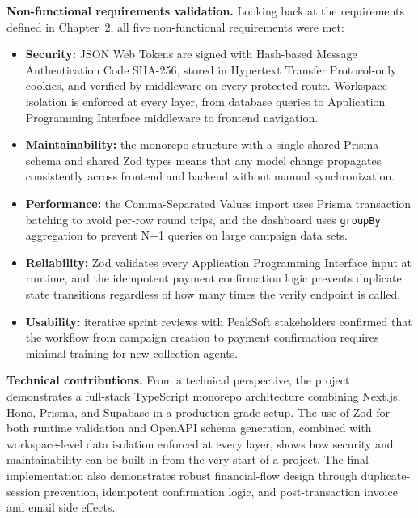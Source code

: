 \documentclass[12pt,a4paper]{report}
\begin{document}
\textbf{Non-functional requirements validation.}
Looking back at the requirements defined in Chapter~2, all five non-functional
requirements were met:
\begin{itemize}
  \item \textbf{Security:} JSON Web Tokens are signed with Hash-based Message Authentication Code SHA-256, stored in
        Hypertext Transfer Protocol-only cookies, and verified by middleware on every protected route.
        Workspace isolation is enforced at every layer, from database queries to
        Application Programming Interface middleware to frontend navigation.
  \item \textbf{Maintainability:} the monorepo structure with a single shared
        Prisma schema and shared Zod types means that any model change propagates
        consistently across frontend and backend without manual synchronization.
  \item \textbf{Performance:} the Comma-Separated Values import uses Prisma transaction batching to
        avoid per-row round trips, and the dashboard uses \texttt{groupBy}
        aggregation to prevent N+1 queries on large campaign data sets.
  \item \textbf{Reliability:} Zod validates every Application Programming Interface input at runtime, and the
        idempotent payment confirmation logic prevents duplicate state transitions
        regardless of how many times the verify endpoint is called.
  \item \textbf{Usability:} iterative sprint reviews with PeakSoft stakeholders
        confirmed that the workflow from campaign creation to payment confirmation
        requires minimal training for new collection agents.
\end{itemize}

\textbf{Technical contributions.}
From a technical perspective, the project demonstrates a full-stack TypeScript
monorepo architecture combining Next.js, Hono, Prisma, and Supabase in a
production-grade setup.
The use of Zod for both runtime validation and OpenAPI schema generation, combined
with workspace-level data isolation enforced at every layer, shows how security and
maintainability can be built in from the very start of a project.
The final implementation also demonstrates robust financial-flow design through
duplicate-session prevention, idempotent confirmation logic, and post-transaction
invoice and email side effects.
\end{document}
